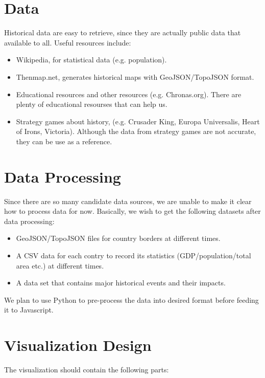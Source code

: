 \documentclass[12pt, fullpage,letterpaper]{article}
\begin{document}
\section{Data}
Historical data are easy to retrieve, since they are actually public data that available to all.
Useful resources include:

\begin{itemize}
    \item Wikipedia, for statistical data (e.g. population).
    \item Thenmap.net, generates historical maps with GeoJSON/TopoJSON format.
    \item Educational resources and other resources (e.g. Chronas.org). There are plenty of educational resourses that can help us.
    \item Strategy games about history, (e.g. Crusader King, Europa Universalis, Heart of Irons, Victoria). Although the data from strategy games are not accurate, they can be use
        as a reference.
\end{itemize}

\section{Data Processing}
Since there are so many candidate data sources, we are unable to make it clear how to process data for now.
Basically, we wish to get the following datasets after data processing:
\begin{itemize}
    \item GeoJSON/TopoJSON files for country borders at different times.
    \item A CSV data for each contry to record its statistics (GDP/population/total area etc.) at different times.
    \item A data set that contains major historical events and their impacts.
\end{itemize}

We plan to use Python to pre-process the data into desired format before feeding it to Javascript.

\section{Visualization Design}

The visualization should contain the following parts:
\end{document}
